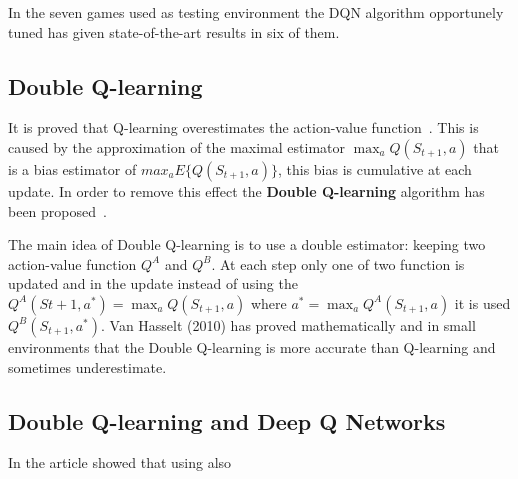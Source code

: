 In the seven games used as testing environment the DQN algorithm opportunely tuned has given state-of-the-art results in six of them.




\subsection{Double Q-learning}

It is proved that Q-learning overestimates the action-value function~\cite{NIPS2010_3964}. This is caused by the approximation of the maximal estimator $\max_a Q(S_{t+1}, a)$ that is a bias estimator of $max_a E \{ Q(S_{t+1}, a) \}$, this bias is cumulative at each update. In order to remove this effect the \textbf{Double Q-learning} algorithm has been proposed~\cite{NIPS2010_3964}.

The main idea of Double Q-learning is to use a double estimator: keeping two action-value function $Q^A$ and $Q^B$. At each step only one of two function is updated and in the update instead of using the $Q^A(S{t+1}, a^*) = \max_a Q(S_{t+1}, a)$ where $a^* = \max_a Q^A(S_{t+1}, a)$ it is used $Q^B(S_{t+1}, a^*)$.
Van Hasselt (2010) has proved mathematically and in small environments that the Double Q-learning is more accurate than Q-learning and sometimes underestimate.

\subsection{Double Q-learning and Deep Q Networks}

In the article \cite{Mnih2015} showed that using also 